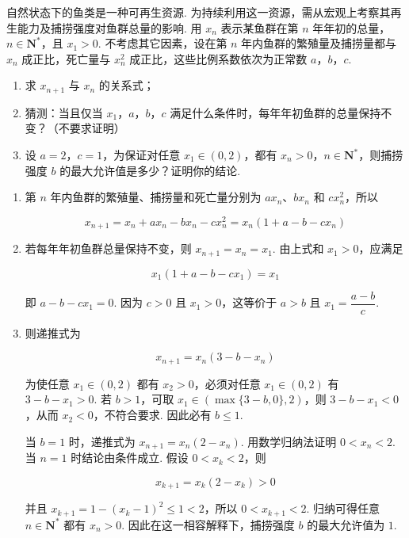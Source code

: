 \begin{problem}
自然状态下的鱼类是一种可再生资源. 为持续利用这一资源，需从宏观上考察其再生能力及捕捞强度对鱼群总量的影响. 用 \(x_{n}\) 表示某鱼群在第 \(n\) 年年初的总量，\(n \in \mathbf{N}^{*}\)，且 \(x_{1} > 0\). 不考虑其它因素，设在第 \(n\) 年内鱼群的繁殖量及捕捞量都与 \(x_{n}\) 成正比，死亡量与 \(x_{n}^{2}\) 成正比，这些比例系数依次为正常数 \(a\)，\(b\)，\(c\).

\begin{enumerate}
\item 求 \(x_{n+1}\) 与 \(x_n\) 的关系式；
\item 猜测：当且仅当 \(x_{1}\)，\(a\)，\(b\)，\(c\) 满足什么条件时，每年年初鱼群的总量保持不变？（不要求证明）
\item 设 \(a = 2\)，\(c = 1\)，为保证对任意 \(x_{1} \in (0,2)\)，都有 \(x_n > 0\)，\(n \in \mathbf{N}^{*}\)，则捕捞强度 \(b\) 的最大允许值是多少？证明你的结论.
\end{enumerate}
\end{problem}

\begin{solution}
\begin{enumerate}
\item 第 \(n\) 年内鱼群的繁殖量、捕捞量和死亡量分别为 \(ax_n\)、\(bx_n\) 和 \(cx_n^{2}\)，所以

\[
x_{n+1}=x_n+ax_n-bx_n-cx_n^{2}=x_n(1+a-b-cx_n)
\]

\item 若每年年初鱼群总量保持不变，则 \(x_{n+1}=x_n=x_1\). 由上式和 \(x_1>0\)，应满足

\[
x_1(1+a-b-cx_1)=x_1
\]

即 \(a-b-cx_1=0\). 因为 \(c>0\) 且 \(x_1>0\)，这等价于 \(a>b\) 且 \(x_1=\dfrac{a-b}{c}\).

\item 则递推式为

\[
x_{n+1}=x_n(3-b-x_n)
\]

为使任意 \(x_1\in(0,2)\) 都有 \(x_2>0\)，必须对任意 \(x_1\in(0,2)\) 有 \(3-b-x_1>0\). 若 \(b>1\)，可取 \(x_1\in(\max\{3-b,0\},2)\)，则 \(3-b-x_1<0\)，从而 \(x_2<0\)，不符合要求. 因此必有 \(b\leqslant1\).

当 \(b=1\) 时，递推式为 \(x_{n+1}=x_n(2-x_n)\). 用数学归纳法证明 \(0<x_n<2\). 当 \(n=1\) 时结论由条件成立. 假设 \(0<x_k<2\)，则

\[
x_{k+1}=x_k(2-x_k)>0
\]

并且 \(x_{k+1}=1-(x_k-1)^2\leqslant1<2\)，所以 \(0<x_{k+1}<2\). 归纳可得任意 \(n\in\mathbf{N}^{*}\) 都有 \(x_n>0\). 因此在这一相容解释下，捕捞强度 \(b\) 的最大允许值为 \(1\).
\end{enumerate}
\end{solution}

